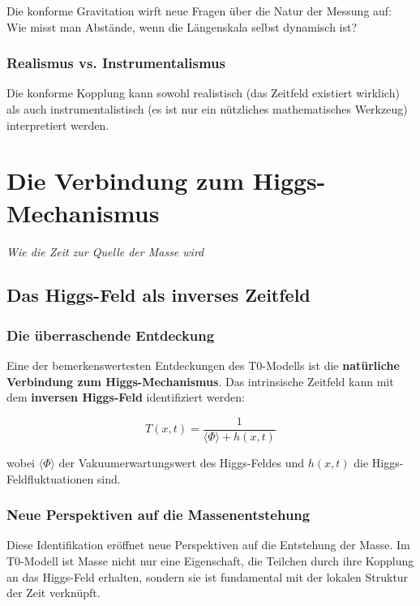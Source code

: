 \documentclass[12pt,a4paper]{report}
\begin{document}
	Die konforme Gravitation wirft neue Fragen über die Natur der Messung auf: Wie misst man Abstände, wenn die Längenskala selbst dynamisch ist?
	
	\subsection{Realismus vs. Instrumentalismus}
	
	Die konforme Kopplung kann sowohl realistisch (das Zeitfeld existiert wirklich) als auch instrumentalistisch (es ist nur ein nützliches mathematisches Werkzeug) interpretiert werden.
	\chapter{Die Verbindung zum Higgs-Mechanismus}
	\textit{Wie die Zeit zur Quelle der Masse wird}
	
	\section{Das Higgs-Feld als inverses Zeitfeld}
	
	\subsection{Die überraschende Entdeckung}
	
	Eine der bemerkenswertesten Entdeckungen des T0-Modells ist die \textbf{natürliche Verbindung zum Higgs-Mechanismus}. Das intrinsische Zeitfeld kann mit dem \textbf{inversen Higgs-Feld} identifiziert werden:
	
	\begin{equation}
		T(x,t) = \frac{1}{\langle\Phi\rangle + h(x,t)}
	\end{equation}
	
	wobei $\langle\Phi\rangle$ der Vakuumerwartungswert des Higgs-Feldes und $h(x,t)$ die Higgs-Feldfluktuationen sind.
	
	\subsection{Neue Perspektiven auf die Massenentstehung}
	
	Diese Identifikation eröffnet neue Perspektiven auf die Entstehung der Masse. Im T0-Modell ist Masse nicht nur eine Eigenschaft, die Teilchen durch ihre Kopplung an das Higgs-Feld erhalten, sondern sie ist fundamental mit der lokalen Struktur der Zeit verknüpft.
	
\end{document}
